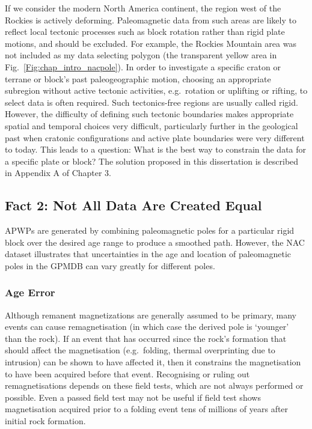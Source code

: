 If we consider the modern North America continent, the region west of the
Rockies is actively deforming. Paleomagnetic data from such areas are likely to
reflect local tectonic processes such as block rotation rather than rigid plate
motions, and should be excluded. For example, the Rockies Mountain area was not
included as my data selecting polygon (the transparent yellow area in
Fig.~\ref{Fig:chap_intro_nacpole}). In order to investigate a specific craton or
terrane or block's past paleogeographic motion, choosing an appropriate
subregion without active tectonic activities, e.g.\ rotation or uplifting or
rifting, to select data is often required. Such tectonics-free regions are
usually called rigid. However, the difficulty of defining such tectonic
boundaries makes appropriate spatial and temporal choices very difficult,
particularly further in the geological past when cratonic configurations and
active plate boundaries were very different to today. This leads to a question:
What is the best way to constrain the data for a specific plate or block? The
solution proposed in this dissertation is described in Appendix A of Chapter 3.

\subsection{Fact 2: Not All Data Are Created Equal}

APWPs are generated by combining paleomagnetic poles for a particular rigid
block over the desired age range to produce a smoothed path. However, the NAC
dataset illustrates that uncertainties in the age and location of paleomagnetic
poles in the GPMDB can vary greatly for different poles.

\subsubsection{Age Error}

Although remanent magnetizations are generally assumed to be primary, many
events can cause remagnetisation (in which case the derived pole is `younger'
than the rock). If an event that has occurred since the rock's formation that
should affect the magnetisation (e.g.\ folding, thermal overprinting due to
intrusion) can be shown to have affected it, then it constrains the
magnetisation to have been acquired before that event. Recognising or ruling
out remagnetisations depends on these field tests, which are not always
performed or possible. Even a passed field test may not be useful if field test
shows magnetisation acquired prior to a folding event tens of millions of years
after initial rock formation.

